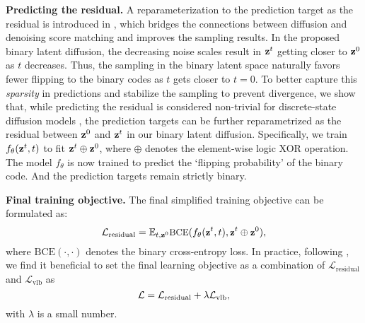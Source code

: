 \documentclass[10pt,twocolumn,letterpaper]{article}
\begin{document}
\noindent \textbf{Predicting the residual.}
A reparameterization to the prediction target as the residual is introduced in \cite{ddpm}, which bridges the connections between diffusion and denoising score matching \cite{score} and improves the sampling results. 
In the proposed binary latent diffusion, the decreasing noise scales result in $\textbf{z}^t$ getting closer to $\textbf{z}^0$ as $t$ decreases. 
Thus, the sampling in the binary latent space naturally favors fewer flipping to the binary codes as $t$ gets closer to $t = 0$. To better capture this \textit{sparsity} in predictions and stabilize the sampling to prevent divergence, we show that, while predicting the residual is considered non-trivial for discrete-state diffusion models \cite{multinomial}, the prediction targets can be further reparametrized as the residual between $\textbf{z}^0$ and $\textbf{z}^t$ in our binary latent diffusion. Specifically, we train $f_\theta(\textbf{z}^t, t)$ to fit $\textbf{z}^t \oplus \textbf{z}^0$, where $\oplus$ denotes the element-wise logic XOR operation. The model $f_\theta$ is now trained to predict the `flipping probability’ of the binary code. And the prediction targets remain strictly binary.


\noindent \textbf{Final training objective.}
The final simplified training objective can be formulated as:
\begin{equation}
\small
    \mathcal{L}_{\text{residual}} = \mathbb{E}_{t, \textbf{z}^0}\text{BCE}(f_\theta(\textbf{z}^t, t), \textbf{z}^t \oplus \textbf{z}^0),
\end{equation}
where $\text{BCE}(\cdot, \cdot)$ denotes the binary cross-entropy loss.
In practice, following \cite{improved_ddpm}, we find it beneficial to set the final learning objective as a combination of $\mathcal{L}_{\text{residual}}$ and $\mathcal{L}_{\text{vlb}}$ as 
\begin{equation}
\small
\label{eq:final}
    \mathcal{L} = \mathcal{L}_{\text{residual}} + \lambda\mathcal{L}_{\text{vlb}},
\end{equation}
with $\lambda$ is a small number.
\end{document}
